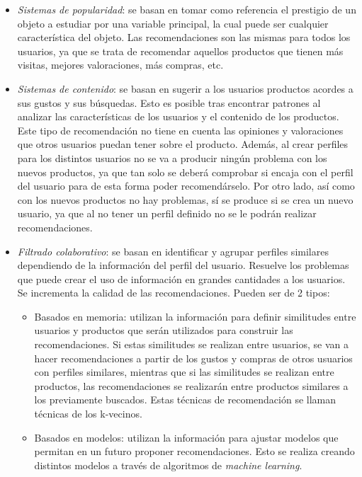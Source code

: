 \begin{itemize}
    \item \textit{Sistemas de popularidad}: se basan en tomar como referencia el prestigio de un objeto a estudiar por una variable principal, la cual puede ser cualquier característica del objeto. Las recomendaciones son las mismas para todos los usuarios, ya que se trata de recomendar aquellos productos que tienen más visitas, mejores valoraciones, más compras, etc.
    
    \item \textit{Sistemas de contenido}: se basan en sugerir a los usuarios productos acordes a sus gustos y sus búsquedas. Esto es posible tras encontrar patrones al analizar las características de los usuarios y el contenido de los productos. 
    Este tipo de recomendación no tiene en cuenta las opiniones y valoraciones que otros usuarios puedan tener sobre el producto. Además, al crear perfiles para los distintos usuarios no se va a producir ningún problema con los nuevos productos, ya que tan solo se deberá comprobar si encaja con el perfil del usuario para de esta forma poder recomendárselo. Por otro lado, así como con los nuevos productos no hay problemas, sí se produce si se crea un nuevo usuario, ya que al no tener un perfil definido no se le podrán realizar recomendaciones.
    
    \item \textit{Filtrado colaborativo}: se basan en identificar y agrupar perfiles similares dependiendo de la información del perfil del usuario. Resuelve los problemas que puede crear el uso de información en grandes cantidades a los usuarios. Se incrementa la calidad de las recomendaciones. Pueden ser de 2 tipos:
    \begin{itemize}
        \item Basados en memoria: utilizan la información para definir similitudes entre usuarios y productos que serán utilizados para construir las recomendaciones. Si estas similitudes se realizan entre usuarios, se van a hacer recomendaciones a partir de los gustos y compras de otros usuarios con perfiles similares, mientras que si las similitudes se realizan entre productos, las recomendaciones se realizarán entre productos similares a los previamente buscados. Estas técnicas de recomendación se llaman técnicas de los k-vecinos.
        
        \item Basados en modelos: utilizan la información para ajustar modelos que permitan en un futuro proponer recomendaciones. Esto se realiza creando distintos modelos a través de algoritmos de \textit{machine learning}.
    \end{itemize}
    

\end{itemize}
